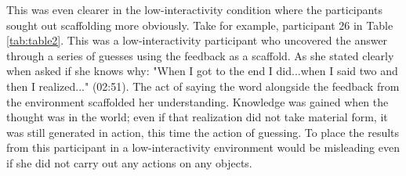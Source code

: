 \documentclass[twocolumn, issue, empirical, authordate,drafn]{jote-new-article}
\begin{document}
This was even clearer in the low-interactivity condition where the participants sought out scaffolding more obviously. Take for example, participant 26 in Table \ref{tab:table2}. This was a low-interactivity participant who uncovered the answer through a series of guesses using the feedback as a scaffold. As she stated clearly when asked if she knows why: "When I got to the end I did...when I said two and then I realized..." (02:51). The act of saying the word alongside the feedback from the environment scaffolded her understanding. Knowledge was gained when the thought was in the world; even if that realization did not take material form, it was still generated in action, this time the action of guessing. To place the results from this participant in a low-interactivity environment would be misleading even if she did not carry out any actions on any objects.
\end{document}
